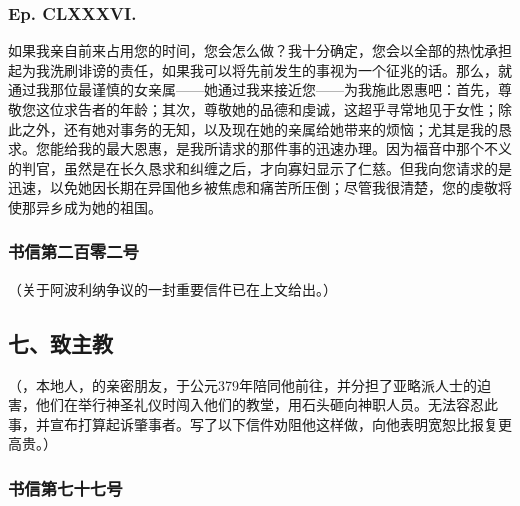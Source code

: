 
\subsubsection{Ep. CLXXXVI.}

\par

如果我亲自前来占用您的时间，您会怎么做？我十分确定，您会以全部的热忱承担起为我洗刷诽谤的责任，如果我可以将先前发生的事视为一个征兆的话。那么，就通过我那位最谨慎的女亲属——她通过我来接近您——为我施此恩惠吧：首先，尊敬您这位求告者的年龄；其次，尊敬她的品德和虔诚，这超乎寻常地见于女性；除此之外，还有她对事务的无知，以及现在她的亲属给她带来的烦恼；尤其是我的恳求。您能给我的最大恩惠，是我所请求的那件事的迅速办理。因为福音中那个不义的判官，虽然是在长久恳求和纠缠之后，才向寡妇显示了仁慈。但我向您请求的是迅速，以免她因长期在异国他乡被焦虑和痛苦所压倒；尽管我很清楚，您的虔敬将使那异乡成为她的祖国。\par


\subsubsection{书信第二百零二号}

（关于阿波利纳争议的一封重要信件已在上文给出。）\par


\subsection{七、致主教}

（，本地人，的亲密朋友，于公元379年陪同他前往，并分担了亚略派人士的迫害，他们在举行神圣礼仪时闯入他们的教堂，用石头砸向神职人员。无法容忍此事，并宣布打算起诉肇事者。写了以下信件劝阻他这样做，向他表明宽恕比报复更高贵。）\par


\subsubsection{书信第七十七号}

